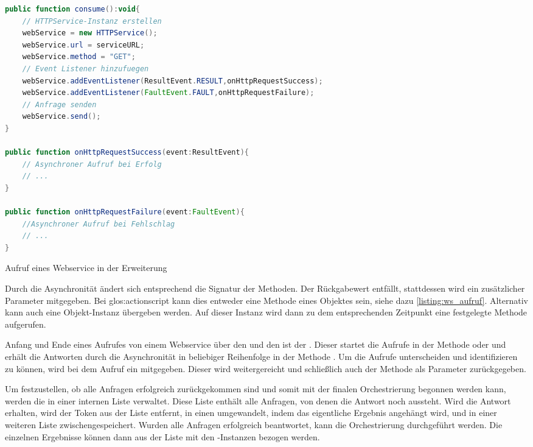 \begin{onehalfspacing}
\begin{programm}[h] %
\begin{lstlisting}[language=ActionScript]
public function consume():void{
	// HTTPService-Instanz erstellen
	webService = new HTTPService();
	webService.url = serviceURL;       
	webService.method = "GET";
	// Event Listener hinzufuegen
	webService.addEventListener(ResultEvent.RESULT,onHttpRequestSuccess);
	webService.addEventListener(FaultEvent.FAULT,onHttpRequestFailure);
	// Anfrage senden
	webService.send();
}
		
public function onHttpRequestSuccess(event:ResultEvent){
	// Asynchroner Aufruf bei Erfolg
	// ...
}
		
public function onHttpRequestFailure(event:FaultEvent){
	//Asynchroner Aufruf bei Fehlschlag
	// ...
}
\end{lstlisting}
\caption{Aufruf eines Webservice in der Erweiterung\label{listing:ws_aufruf}}
\end{programm}

Durch die Asynchronität ändert sich entsprechend die Signatur der Methoden. Der Rückgabewert entfällt, stattdessen wird ein zusätzlicher Parameter mitgegeben. Bei \gls{glos:actionscript} kann dies entweder eine Methode eines Objektes sein, siehe dazu \vref{listing:ws_aufruf}. Alternativ kann auch eine Objekt-Instanz übergeben werden. Auf dieser Instanz wird dann zu dem entsprechenden Zeitpunkt eine festgelegte Methode aufgerufen.

Anfang und Ende eines Aufrufes von einem Webservice über den  und den  ist der . Dieser startet die Aufrufe in der Methode  oder  und erhält die Antworten durch die Asynchronität in beliebiger Reihenfolge in der Methode . Um die Aufrufe unterscheiden und identifizieren zu können, wird bei dem Aufruf ein  mitgegeben. Dieser wird weitergereicht und schließlich auch der Methode  als Parameter zurückgegeben.

Um festzustellen, ob alle Anfragen erfolgreich zurückgekommen sind und somit mit der finalen Orchestrierung begonnen werden kann, werden die  in einer internen Liste verwaltet. Diese Liste enthält alle Anfragen, von denen die Antwort noch aussteht.  Wird die Antwort erhalten, wird der Token aus der Liste entfernt, in einen  umgewandelt, indem das eigentliche Ergebnis angehängt wird, und in einer weiteren Liste zwischengespeichert. Wurden alle Anfragen erfolgreich beantwortet, kann die Orchestrierung durchgeführt werden. Die einzelnen Ergebnisse können dann aus der Liste mit den -Instanzen bezogen werden.


\end{onehalfspacing}
